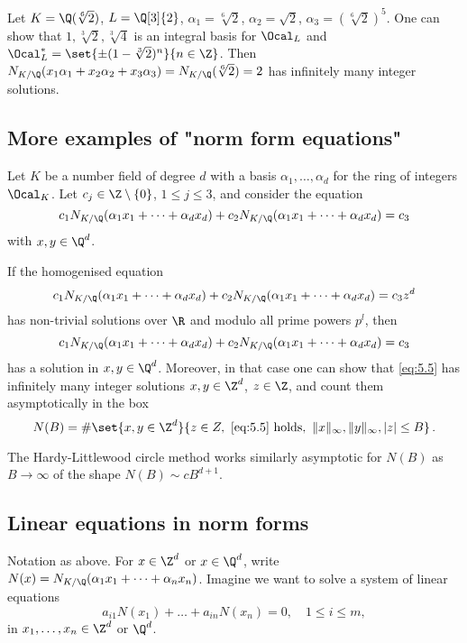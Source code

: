 \begin{exmp*}
	Let \( K = \Q(\sqrt[6]{2}) \), \( L = \Q[3]{2} \), \( \alpha_1 = \sqrt[6]{2} \), \( \alpha_2 = \sqrt{2} \), \( \alpha_3 = (\sqrt[6]{2})^5 \).
	One can show that \( 1, \sqrt[3]{2}, \sqrt[3]{4} \) is an integral basis for \( \Ocal_L \) and \( \Ocal_L^* = \set{\pm (1-\sqrt[3]{2})^n}{n \in \Z} \).
	Then \( N_{K/\Q}(x_1 \alpha_1 + x_2 \alpha_2 + x_3 \alpha_3) = N_{K/\Q} (\sqrt[6]{2}) = 2 \) has infinitely many integer solutions.
\end{exmp*}

\subsection*{More examples of "norm form equations"}

Let \( K \) be a number field of degree \( d \) with a basis \( \alpha_1, \dotsc, \alpha_d \) for the ring of integers \( \Ocal_K \).
Let \( c_j \in \Z\setminus \{0\} \), \( 1 \leq j \leq 3 \), and consider the equation
\[ c_1 N_{K/\Q} (\alpha_1 x_1 + \dots + \alpha_d x_d) + c_2 N_{K/\Q} (\alpha_1 x_1 + \dots + \alpha_d x_d) = c_3 \]
with \( x,y \in \Q^d \).

\begin{thm*}
	If the homogenised equation
	\begin{equation}\label{eq:5.5}
		c_1 N_{K/\Q} (\alpha_1 x_1 + \dots + \alpha_d x_d) + c_2 N_{K/\Q} (\alpha_1 x_1 + \dots + \alpha_d x_d) = c_3z^d
	\end{equation}
	has non-trivial solutions over \( \R \) and modulo all prime powers \( p^l \), then
	\[ c_1 N_{K/\Q} (\alpha_1 x_1 + \dots + \alpha_d x_d) + c_2 N_{K/\Q} (\alpha_1 x_1 + \dots + \alpha_d x_d) = c_3 \]
	has a solution in \( x,y \in \Q^d \).
	Moreover, in that case one can show that \eqref{eq:5.5} has infinitely many integer solutions \( x,y \in \Z^d \), \( z \in \Z \), and count them asymptotically in the box
	\[ N(B) = \# \set{x,y \in \Z^d}{z \in Z,\ \eqref{eq:5.5}\ \text{holds},\ \|x\|_\infty, \|y\|_\infty, |z| \leq B} \,. \]
\end{thm*}

The Hardy-Littlewood circle method works similarly asymptotic for \( N(B) \) as \( B \to \infty \) of the shape \( N(B) \sim cB^{d+1} \).


\subsection*{Linear equations in norm forms}
Notation as above.
For \( x \in \Z^d \) or \( x \in \Q^d \), write \( N(x) = N_{K/\Q}(\alpha_1 x_1 + \dots + \alpha_n x_n) \).
Imagine we want to solve a system of linear equations
\[ a_{i1} N(x_1) + \dots + a_{in} N(x_n) = 0, \quad 1 \leq i \leq m, \]
in \( x_1, \dotsc, x_n \in \Z^d \) or \( \Q^d \).